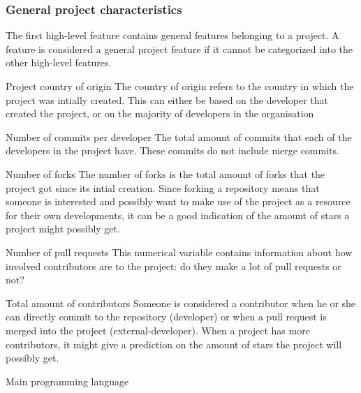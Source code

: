     \subsubsection{General project characteristics}
    The first high-level feature contains general features belonging to a project. 
    A feature is considered a general project feature if it cannot be categorized into the other high-level features.
    \begin{LaTeXdescription}
        \item[Project country of origin]
        The country of origin refers to the country in which the project was intially created.
        This can either be based on the developer that created the project, or on the majority of developers in the organisation
        \item[Number of commits per developer]
        The total amount of commits that each of the developers in the project have.
        These commits do not include merge commits.
        \item[Number of forks]
        The number of forks is the total amount of forks that the project got since its intial creation.
        Since forking a repository means that someone is interested and possibly want to make use of the project as a resource for their own developments, it can be a good indication of the amount of stars a project might possibly get.
        \item[Number of pull requests]
        This numerical variable contains information about how involved contributors are to the project: do they make a lot of pull requests or not?
        \item[Total amount of contributors]
        Someone is considered a contributor when he or she can directly commit to the repository (developer) or when a pull request is merged into the project (external-developer).
        When a project has more contributors, it might give a prediction on the amount of stars the project will possibly get.
        \item[Main programming language]

\end{LaTeXdescription}

